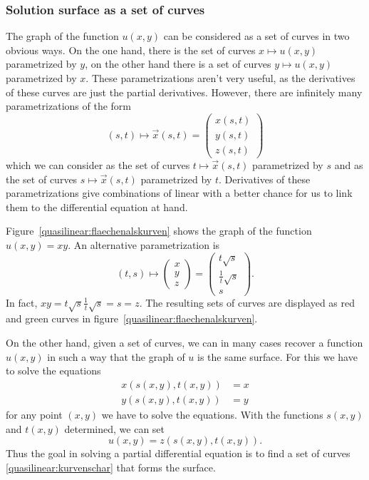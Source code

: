 \subsubsection{Solution surface as a set of curves}
The graph of the function $u(x,y)$ can be considered as a set of curves
in two obvious ways.
On the one hand, there is the set of curves $x\mapsto u(x,y)$ parametrized
by $y$, on the other hand there is a set of curves $y\mapsto u(x,y)$
parametrized by $x$.
These parametrizations aren't very useful, as the derivatives of these
curves are just the partial derivatives.
However, there are infinitely many parametrizations of the form
\begin{equation}
(s,t)\mapsto \vec x(s,t)
=
\begin{pmatrix}x(s,t)\\y(s,t)\\z(s,t)\end{pmatrix}
\label{quasilinear:kurvenschar}
\end{equation}
which we can consider as the set of curves $t\mapsto \vec x(s,t)$
parametrized by $s$ and as the set of curves $s\mapsto\vec x(s,t)$
parametrized by $t$.
Derivatives of these parametrizations give combinations of linear 
with a better chance for us to link them to the differential equation
at hand.

\begin{beispiel}
Figure~\ref{quasilinear:flaechenalskurven} shows the graph of the function
$u(x,y)=xy$.
An alternative parametrization is
\begin{equation}
(t,s)
\mapsto
\begin{pmatrix}x\\y\\z\end{pmatrix}
=
\begin{pmatrix}t\sqrt{s}\\\frac1t\sqrt{s}\\s\end{pmatrix}.
\label{quasliniear:flaechebeispiel}
\end{equation}
In fact, $xy = t\sqrt{s}\frac1t\sqrt{s}=s=z$.
The resulting sets of curves are displayed as red and green curves
in figure~\ref{quasilinear:flaechenalskurven}.
\end{beispiel}

On the other hand, given a set of curves, we can in many cases recover
a function $u(x,y)$ in such a way that the graph of $u$ is the same
surface.
For this we have to solve the equations
\begin{align*}
x(s(x,y),t(x,y))&=x\\
y(s(x,y),t(x,y))&=y
\end{align*}
for any point $(x,y)$ we have to solve the equations.
With the functions $s(x,y)$ and $t(x,y)$ determined, we can set
\[
u(x,y)=z(s(x,y), t(x,y)).
\]
Thus the goal in solving a partial differential equation is to find
a set of curves \eqref{quasilinear:kurvenschar} that forms the surface.

